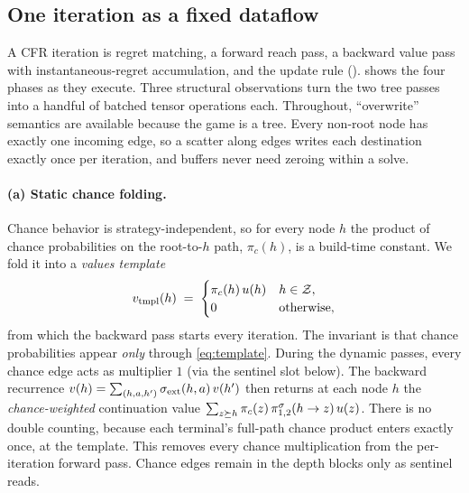 \subsection{One iteration as a fixed dataflow}
\label{sec:dataflow}

A CFR iteration is regret matching, a forward reach pass, a backward value pass with
instantaneous-regret accumulation, and the update rule
().  shows the four phases as they
execute. Three structural observations turn the two tree passes into a handful of
batched tensor operations each. Throughout, ``overwrite'' semantics are available
because the game is a tree. Every non-root node has exactly one incoming edge, so a
scatter along edges writes each destination exactly once per iteration, and buffers
never need zeroing within a solve.

\paragraph{(a) Static chance folding.}
Chance behavior is strategy-independent, so for every node $h$ the product of chance
probabilities on the root-to-$h$ path, $\pi_c(h)$, is a build-time constant. We fold
it into a \emph{values template}
\begin{equation}
    v_{\mathrm{tmpl}}(h) \;=\;
    \begin{cases}
        \pi_c(h)\, u(h) & h \in \mathcal{Z},\\
        0 & \text{otherwise},
    \end{cases}
    \label{eq:template}
\end{equation}
from which the backward pass starts every iteration. The invariant is that chance probabilities appear \emph{only} through
\cref{eq:template}. During the dynamic passes, every chance edge acts as multiplier
$1$ (via the sentinel slot below). The backward recurrence
$v(h) = \sum_{(h,a,h')} \sigma_{\mathrm{ext}}(h,a)\, v(h')$
then returns at each node $h$ the \emph{chance-weighted} continuation value
$\sum_{z \succeq h} \pi_c(z)\, \pi^{\sigma}_{1,2}(h \to z)\, u(z)$. There is
no double counting, because each terminal's full-path chance product enters exactly
once, at the template. This removes every chance multiplication from the
per-iteration forward pass. Chance edges remain in the depth blocks only as sentinel
reads.


